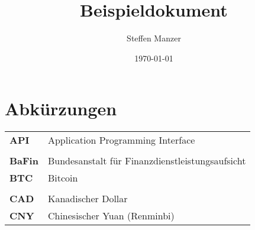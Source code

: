 \documentclass[
    twoside=true,
    fontsize=11pt,
    DIV=15,
    BCOR=17mm,
    headsepline=true, footsepline=false,
    open=right,
    a4paper,
    listof=totoc, bibliography=totoc,
    headinclude=true, footinclude=false,
    parskip=half,
    numbers=noenddot,
    ngerman
]{scrbook}
\title{Beispieldokument}
\author{Steffen Manzer}
\date{\today}
\begin{document}

    
    \setcounter{page}{1}
    
    
    \tableofcontents
    \newpage

    \listoffigures
    \newpage
    
    \listoftables
    \newpage
    
    
    
    \chapter*{Abkürzungen}

    \bgroup
    \renewcommand*{\arraystretch}{1.2} %
    \begin{longtable}[l]{ @{} l l @{} }
    
    \textbf{API}    & Application Programming Interface \\
    \vspace{1mm} \\
    \textbf{BaFin}  & Bundesanstalt für Finanzdienstleistungsaufsicht \\
    \textbf{BTC}    & Bitcoin \\
    \vspace{1mm} \\
    \textbf{CAD}    & Kanadischer Dollar \\
    \textbf{CNY}    & Chinesischer Yuan (Renminbi) \\
    
    \end{longtable}
    \egroup
    \newpage
    
    
    

    \setcounter{page}{1}
\end{document}
